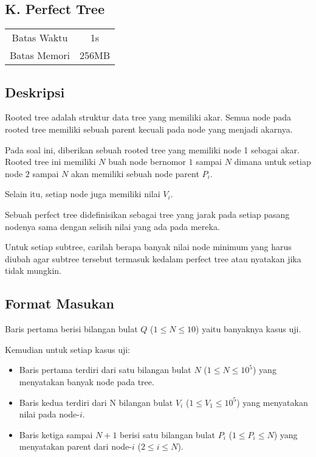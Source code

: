 \documentclass{article}
\begin{document}
\begin{center}
    \section*{K. Perfect Tree} %

    \begin{tabular}{ | c c | }
        \hline
        Batas Waktu  & 1s \\    %
        Batas Memori & 256MB \\  %
        \hline
    \end{tabular}
\end{center}

\subsection*{Deskripsi}

Rooted tree adalah struktur data tree yang memiliki akar. Semua node pada rooted tree memiliki sebuah parent kecuali pada node yang menjadi akarnya.

Pada soal ini, diberikan sebuah rooted tree yang memiliki node 1 sebagai akar. Rooted tree ini memiliki $N$ buah node bernomor $1$ sampai $N$ dimana untuk setiap node $2$ sampai $N$ akan memiliki sebuah node parent $P_i$. 

Selain itu, setiap node juga memiliki nilai $V_i$.

Sebuah perfect tree didefinisikan sebagai tree yang jarak pada setiap pasang nodenya sama dengan selisih nilai yang ada pada mereka.

Untuk setiap subtree, carilah berapa banyak nilai node minimum yang harus diubah agar subtree tersebut termasuk kedalam perfect tree atau nyatakan jika tidak mungkin.


\subsection*{Format Masukan}

Baris pertama berisi bilangan bulat $Q$ ($1 \leq N \leq 10$) yaitu banyaknya kasus uji.

Kemudian untuk setiap kasus uji:

\begin{itemize}
    \item Baris pertama terdiri dari satu bilangan bulat $N$ ($1 \leq N \leq 10^5$) yang menyatakan banyak node pada tree.
    \item Baris kedua terdiri dari N bilangan bulat $V_i$ ($1 \leq V_1 \leq 10^5$) yang menyatakan nilai pada node-$i$.
    \item Baris ketiga sampai $N + 1$ berisi satu bilangan bulat $P_i$ ($1 \leq P_i \leq N$) yang menyatakan parent dari node-$i$ ($2 \leq i \leq N$).
\end{itemize}
\end{document}
